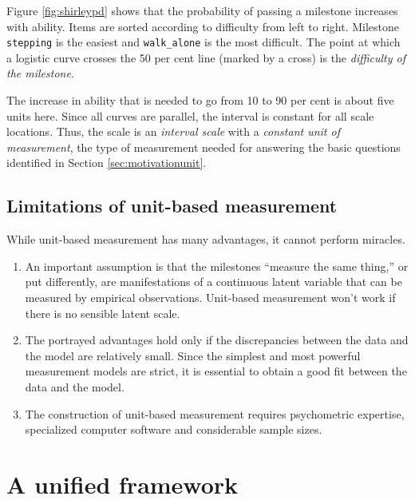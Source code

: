 \documentclass[
]{book}
\providecommand{\tightlist}{%
  \setlength{\itemsep}{0pt}\setlength{\parskip}{0pt}}
\begin{document}
Figure \ref{fig:shirleypd} shows that the probability of passing a milestone increases with ability. Items are sorted according to difficulty from left to right. Milestone \texttt{stepping} is the easiest and \texttt{walk\_alone} is the most difficult. The point at which a logistic curve crosses the 50 per cent line (marked by a cross) is the \emph{difficulty of the milestone}.

The increase in ability that is needed to go from 10 to 90 per cent is about five units here. Since all curves are parallel, the interval is constant for all scale locations. Thus, the scale is an \emph{interval scale} with a \emph{constant unit of measurement}, the type of measurement needed for answering the basic questions identified in Section \ref{sec:motivationunit}.

\hypertarget{limitations-of-unit-based-measurement}{%
\subsection{Limitations of unit-based measurement}\label{limitations-of-unit-based-measurement}}

While unit-based measurement has many advantages, it cannot perform miracles.

\begin{enumerate}
\def\labelenumi{\arabic{enumi}.}
\tightlist
\item
  An important assumption is that the milestones ``measure the same thing,'' or put differently, are manifestations of a continuous latent variable that can be measured by empirical observations. Unit-based measurement won't work if there is no sensible latent scale.
\item
  The portrayed advantages hold only if the discrepancies between the data and the model are relatively small. Since the simplest and most powerful measurement models are strict, it is essential to obtain a good fit between the data and the model.
\item
  The construction of unit-based measurement requires psychometric expertise, specialized computer software and considerable sample sizes.
\end{enumerate}

\hypertarget{sec:whatismeasurement}{%
\section{A unified framework}\label{sec:whatismeasurement}}
\end{document}
